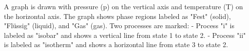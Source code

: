 A graph is drawn with pressure (p) on the vertical axis and temperature (T) on the horizontal axis. The graph shows phase regions labeled as "Fest" (solid), "Flüssig" (liquid), and "Gas" (gas). Two processes are marked:  
- Process "i" is labeled as "isobar" and shows a vertical line from state 1 to state 2.  
- Process "ii" is labeled as "isotherm" and shows a horizontal line from state 3 to state 2.